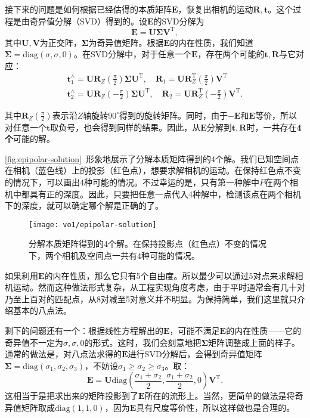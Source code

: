 接下来的问题是如何根据已经估得的本质矩阵$\bm{E}$，恢复出相机的运动$\bm{R}, \bm{t}$。这个过程是由奇异值分解（SVD）得到的。设$\bm{E}$的SVD分解为
\begin{equation}
\bm{E} = \bm{U} \bm{\Sigma} \bm{V}^\mathrm{T},
\end{equation}
其中$\bm{U}, \bm{V}$为正交阵，$\bm{\Sigma}$为奇异值矩阵。根据$\bm{E}$的内在性质，我们知道$\bm{\Sigma} = \mathrm{diag}( \sigma, \sigma, 0 )$。在SVD分解中，对于任意一个$\bm{E}$，存在两个可能的$\bm{t}, \bm{R}$与它对应：
\begin{equation}
\begin{array}{l}
\bm{t}_1^ \wedge  = \bm{U}{\bm{R}_Z}(\frac{\pi }{2}) \bm{\Sigma} {\bm{U}^\mathrm{T}}, \quad {\bm{R}_1} = \bm{U} \bm{R}_Z^\mathrm{T}(\frac{\pi }{2}){ \bm{V}^\mathrm{T}}\\
\bm{t}_2^ \wedge  = \bm{U}{\bm{R}_Z}( - \frac{\pi }{2})\bm{\Sigma} {\bm{U}^\mathrm{T}}, \quad  {\bm{R}_2} = \bm{U} \bm{R}_Z^\mathrm{T}( - \frac{\pi }{2}){\bm{V}^\mathrm{T}}.
\end{array}
\end{equation}

其中$\bm{R}_Z\left(\frac{\pi }{2}\right)$表示沿$Z$轴旋转$90^\circ$得到的旋转矩阵。同时，由于$-\bm{E}$和$\bm{E}$等价，所以对任意一个$\bm{t}$取负号，也会得到同样的结果。因此，从$\bm{E}$分解到$\bm{t}, \bm{R}$时，一共存在\textbf{4个}可能的解。

\autoref{fig:epipolar-solution}~形象地展示了分解本质矩阵得到的4个解。我们已知空间点在相机（蓝色线）上的投影（红色点），想要求解相机的运动。在保持红色点不变的情况下，可以画出4种可能的情况。不过幸运的是，只有第一种解中$P$在两个相机中都具有正的深度。因此，只要把任意一点代入4种解中，检测该点在两个相机下的深度，就可以确定哪个解是正确的了。

\begin{figure}[!htp]
	\centering
	\texttt{[image: vo1/epipolar-solution]}
	\caption{分解本质矩阵得到的4个解。在保持投影点（红色点）不变的情况下，两个相机及空间点一共有4种可能的情况。}
	\label{fig:epipolar-solution}
\end{figure}

如果利用$\bm{E}$的内在性质，那么它只有5个自由度。所以最少可以通过5对点来求解相机运动\textsuperscript{\cite{Li2006, Nister2004a}}。然而这种做法形式复杂，从工程实现角度考虑，由于平时通常会有几十对乃至上百对的匹配点，从8对减至5对意义并不明显。为保持简单，我们这里就只介绍基本的八点法。

剩下的问题还有一个：根据线性方程解出的$\bm{E}$，可能不满足$\bm{E}$的内在性质——它的奇异值不一定为${\sigma}, {\sigma}, 0$的形式。这时，我们会刻意地把$\bm{\Sigma}$矩阵调整成上面的样子。通常的做法是，对八点法求得的$\bm{E}$进行SVD分解后，会得到奇异值矩阵$\bm{\Sigma} =  \mathrm{diag} ( \sigma_1, \sigma_2, \sigma_3)$，不妨设$\sigma_1 \geqslant \sigma_2 \geqslant \sigma_3$。取：
\begin{equation}
\bm{E} = \bm{U} \mathrm{diag} (\frac{\sigma_1+\sigma_2}{2}, \frac{\sigma_1+\sigma_2}{2}, 0) \bm{V}^\mathrm{T}.
\end{equation}
这相当于是把求出来的矩阵投影到了$\bm{E}$所在的流形上。当然，更简单的做法是将奇异值矩阵取成$\mathrm{diag} (1,1,0)$，因为$\bm{E}$具有尺度等价性，所以这样做也是合理的。

